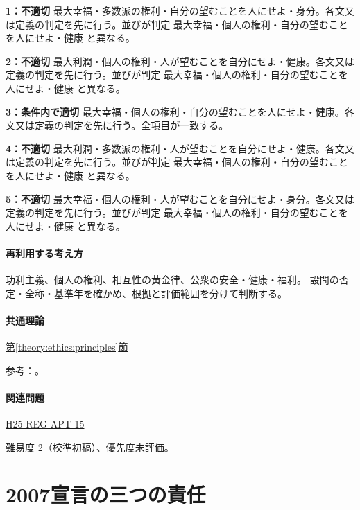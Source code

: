 \noindent\textbf{1：不適切} 最大幸福・多数派の権利・自分の望むことを人にせよ・身分。各文又は定義の判定を先に行う。並びが判定 最大幸福・個人の権利・自分の望むことを人にせよ・健康 と異なる。\par

\noindent\textbf{2：不適切} 最大利潤・個人の権利・人が望むことを自分にせよ・健康。各文又は定義の判定を先に行う。並びが判定 最大幸福・個人の権利・自分の望むことを人にせよ・健康 と異なる。\par

\noindent\textbf{3：条件内で適切} 最大幸福・個人の権利・自分の望むことを人にせよ・健康。各文又は定義の判定を先に行う。全項目が一致する。\par

\noindent\textbf{4：不適切} 最大利潤・多数派の権利・人が望むことを自分にせよ・健康。各文又は定義の判定を先に行う。並びが判定 最大幸福・個人の権利・自分の望むことを人にせよ・健康 と異なる。\par

\noindent\textbf{5：不適切} 最大幸福・個人の権利・人が望むことを自分にせよ・身分。各文又は定義の判定を先に行う。並びが判定 最大幸福・個人の権利・自分の望むことを人にせよ・健康 と異なる。\par

\paragraph{再利用する考え方} 功利主義、個人の権利、相互性の黄金律、公衆の安全・健康・福利。 設問の否定・全称・基準年を確かめ、根拠と評価範囲を分けて判断する。

\paragraph{共通理論} \hyperref[theory:ethics:principles]{第\ref*{theory:ethics:principles}節}

\par 参考：\cite{scu_ethics_framework,ipej_ethics2011}。

\paragraph{関連問題} \hyperref[q:h25-reg-apt-15]{H25-REG-APT-15}

\par 難易度 2（校準初稿）、優先度未評価。

\section{2007宣言の三つの責任}

